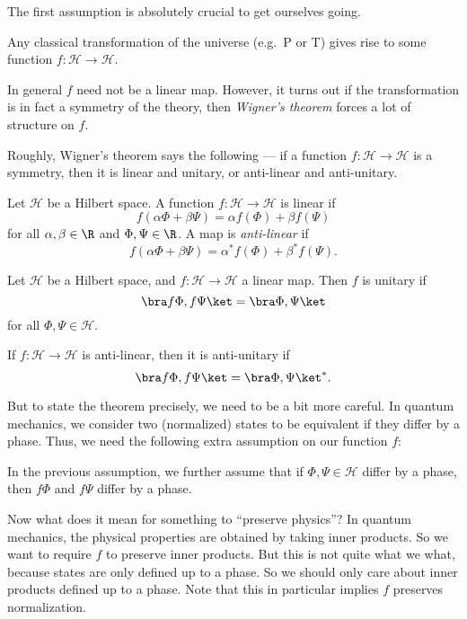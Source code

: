 \documentclass[a4paper]{article}
\begin{document}
The first assumption is absolutely crucial to get ourselves going.
\begin{assumption}
  Any classical transformation of the universe (e.g.\ P or T) gives rise to some function $f: \mathcal{H} \to \mathcal{H}$.
\end{assumption}
In general $f$ need not be a linear map. However, it turns out if the transformation is in fact a symmetry of the theory, then \emph{Wigner's theorem} forces a lot of structure on $f$.

Roughly, Wigner's theorem says the following --- if a function $f: \mathcal{H} \to \mathcal{H}$ is a symmetry, then it is linear and unitary, or anti-linear and anti-unitary.
\begin{defi}
  Let $\mathcal{H}$ be a Hilbert space. A function $f: \mathcal{H} \to \mathcal{H}$ is linear if
  \[
    f(\alpha \Phi + \beta \Psi) = \alpha f(\Phi) + \beta f(\Psi)
  \]
  for all $\alpha, \beta \in \R$ and $\Phi, \Psi \in \R$. A map is \emph{anti-linear} if
  \[
    f(\alpha \Phi + \beta \Psi) = \alpha^* f(\Phi) + \beta^* f(\Psi).
  \]
\end{defi}
\begin{defi}
  Let $\mathcal{H}$ be a Hilbert space, and $f: \mathcal{H} \to \mathcal{H}$ a linear map. Then $f$ is unitary if
  \[
    \bra f \Phi, f \Psi\ket = \bra \Phi, \Psi\ket
  \]
  for all $\Phi, \Psi \in \mathcal{H}$.

  If $f: \mathcal{H} \to \mathcal{H}$ is anti-linear, then it is anti-unitary if
  \[
    \bra f \Phi, f \Psi\ket = \bra \Phi, \Psi\ket^*.
  \]
\end{defi}
But to state the theorem precisely, we need to be a bit more careful. In quantum mechanics, we consider two (normalized) states to be equivalent if they differ by a phase. Thus, we need the following extra assumption on our function $f$:
\begin{assumption}
  In the previous assumption, we further assume that if $\Phi, \Psi \in \mathcal{H}$ differ by a phase, then $f\Phi$ and $f\Psi$ differ by a phase.
\end{assumption}
Now what does it mean for something to ``preserve physics''? In quantum mechanics, the physical properties are obtained by taking inner products. So we want to require $f$ to preserve inner products. But this is not quite what we what, because states are only defined up to a phase. So we should only care about inner products defined up to a phase. Note that this in particular implies $f$ preserves normalization.
\end{document}
